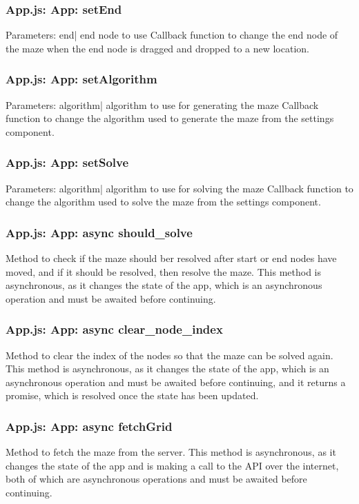 \documentclass{article}
\begin{document}
\subsubsection{App.js: App: setEnd}
Parameters:\newline
\indent end| end node to use\newline
Callback function to change the end node of the maze when the end node is dragged and dropped to a new location.

\subsubsection{App.js: App: setAlgorithm}
Parameters:\newline
\indent algorithm| algorithm to use for generating the maze\newline
Callback function to change the algorithm used to generate the maze from the settings component.

\subsubsection{App.js: App: setSolve}
Parameters:\newline
\indent algorithm| algorithm to use for solving the maze\newline
Callback function to change the algorithm used to solve the maze from the settings component.

\subsubsection{App.js: App: async should\_solve}
Method to check if the maze should ber resolved after start or end nodes have moved, and if it should be resolved, then resolve the maze. This method is asynchronous, as it changes the state of the app, which is an asynchronous operation and must be awaited before continuing.

\subsubsection{App.js: App: async clear\_node\_index}
Method to clear the index of the nodes so that the maze can be solved again. This method is asynchronous, as it changes the state of the app, which is an asynchronous operation and must be awaited before continuing, and it returns a promise, which is resolved once the state has been updated.

\subsubsection{App.js: App: async fetchGrid}
Method to fetch the maze from the server. This method is asynchronous, as it changes the state of the app and is making a call to the API over the internet, both of which are asynchronous operations and must be awaited before continuing.
\end{document}
